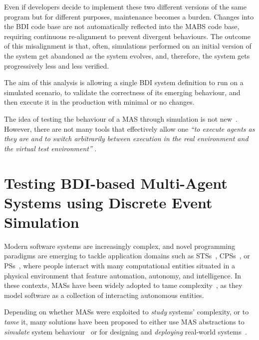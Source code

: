 Even if developers decide to implement these two different versions of the same program but for different purposes,
maintenance becomes a burden.
%
Changes into the \ac{BDI} code base are not automatically reflected into the \ac{MABS} code base,
requiring continuous re-alignment to prevent divergent behaviours.
%
The outcome of this misalignment is that,
often,
simulations performed on an initial version of the system get abandoned as the system evolves,
and, therefore, the system gets progressively less and less verified.

The aim of this analysis is allowing a single \ac{BDI} system definition to 
run on a simulated scenario, to validate the correctness of its emerging behaviour, 
and then execute it in the production with minimal or no changes.

The idea of testing the behaviour of a \ac{MAS} through simulation
is not new~\cite{uhrmacher_simulation_2002}.
%
However, 
there are not many tools that effectively allow one
\emph{
    ``to execute agents as they are and to switch arbitrarily between execution in the real environment and the virtual test environment''
}\cite{uhrmacher_simulation_2002}.


\chapter[Testing BDI-based MAS using DES]{Testing BDI-based Multi-Agent Systems using Discrete Event Simulation}
\label{chap:bdi-simulation}

Modern software systems are increasingly complex,
and novel programming paradigms are emerging
to tackle application domains such as
\acp{STS}~\cite{sociotech}, \acp{CPS}~\cite{cps}, or \acp{PS}~\cite{pervasive},
where people interact with many computational entities situated in a physical environment
that feature automation, autonomy, and intelligence.
%
In these contexts,
\acp{MAS} have been widely adopted to tame complexity~\cite{Xie2017},
as they model software as a collection of interacting autonomous entities.

Depending on whether \acp{MAS} were exploited to \emph{study} systems' complexity,
or to \emph{tame} it,
many solutions have been proposed to either
use \ac{MAS} abstractions to \emph{simulate} system behaviour~\cite{BandiniMV09}
or for designing and \emph{deploying} real-world systems~\cite{CalegariCMO21}.

